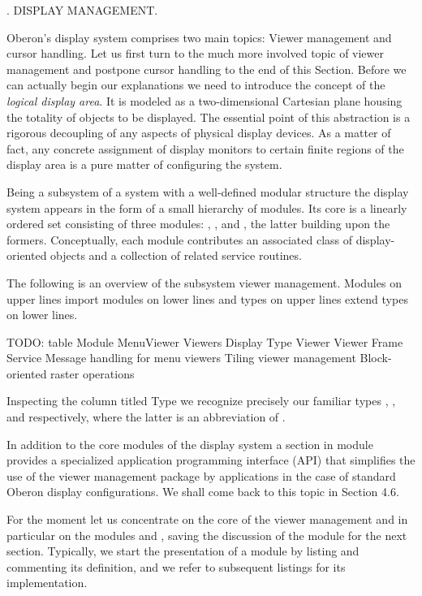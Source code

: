 . DISPLAY MANAGEMENT.

Oberon's display system comprises two main topics: Viewer management
and cursor handling. Let us first turn to the much more involved topic
of viewer management and postpone cursor handling to the end of this
Section. Before we can actually begin our explanations we need to
introduce the concept of the \emph{logical display area}. It is modeled as a
two-dimensional Cartesian plane housing the totality of objects to be
displayed. The essential point of this abstraction is a rigorous
decoupling of any aspects of physical display devices. As a matter of
fact, any concrete assignment of display monitors to certain finite
regions of the display area is a pure matter of configuring the
system.

Being a subsystem of a system with a well-defined modular structure
the display system appears in the form of a small hierarchy of
modules. Its core is a linearly ordered set consisting of three
modules: , , and , the latter building upon
the formers. Conceptually, each module contributes an associated class
of display-oriented objects and a collection of related service
routines.

The following is an overview of the subsystem viewer
management. Modules on upper lines import modules on lower lines and
types on upper lines extend types on lower lines.

TODO: table
Module
MenuViewer Viewers Display
Type
Viewer Viewer Frame
Service
Message handling for menu viewers Tiling viewer management Block-oriented raster operations

Inspecting the column titled Type we recognize precisely our familiar
types , , and  respectively, where the latter is
an abbreviation of .

In addition to the core modules of the display system a section in
module  provides a specialized application programming interface
(API) that simplifies the use of the viewer management package by
applications in the case of standard Oberon display configurations. We
shall come back to this topic in Section 4.6.

For the moment let us concentrate on the core of the viewer management
and in particular on the modules  and , saving the
discussion of the module  for the next section. Typically, we
start the presentation of a module by listing and commenting its
definition, and we refer to subsequent listings for its
implementation.

